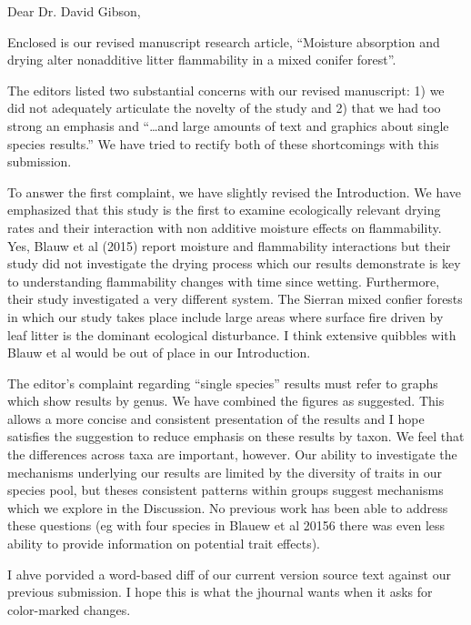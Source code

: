 \documentclass[letterpaper, 12pt]{letter}
\begin{document}
\begin{letter}{}

\opening{Dear Dr. David Gibson,}

Enclosed is our revised manuscript research article, ``Moisture absorption and drying alter nonadditive litter flammability in a mixed conifer forest''.

The editors listed two substantial concerns with our revised manuscript: 1) we did not adequately articulate the novelty of the study and 2) that we had too strong an emphasis and ``\ldots and large amounts of text and graphics about single species results.'' We have tried to rectify both of these shortcomings with this submission. 

To answer the first complaint, we have slightly revised the Introduction. We have emphasized that this study is the first to examine ecologically relevant drying rates and their interaction with non additive moisture effects on flammability. Yes, Blauw et al (2015) report moisture and flammability interactions but their study did not investigate the drying process which our results demonstrate is key to understanding flammability changes with time since wetting. Furthermore, their study investigated a very different system. The Sierran mixed confier forests in which our study takes place include large areas where surface fire driven by leaf litter is the dominant ecological disturbance. I think extensive quibbles with Blauw et al would be out of place in our Introduction.

The editor's complaint regarding ``single species'' results must refer to graphs which show results by genus. We have combined the figures as suggested. This allows a more concise and consistent presentation of the results and I hope satisfies the suggestion to reduce emphasis on these results by taxon. We feel that the differences across taxa are important, however. Our ability to investigate the mechanisms underlying our results are limited by the diversity of traits in our species pool, but theses consistent patterns within groups suggest mechanisms which we explore in the Discussion. No previous work has been able to address these questions (eg with four species in Blauew et al 20156 there was even less ability to provide information on potential trait effects).


I ahve porvided a word-based diff of our current version source text against our previous submission.  I hope this is what the jhournal wants when it asks for color-marked changes.  



\end{letter}
\end{document}
